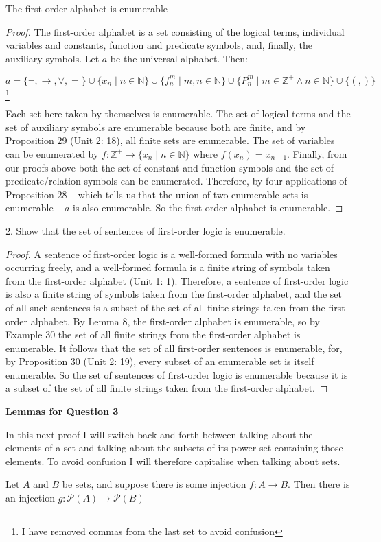 \documentclass{article}
\begin{document}
\begin{lemma} The first-order alphabet is enumerable \end{lemma}
\begin{proof} The first-order alphabet is a set consisting of the logical terms, individual variables and constants, function and predicate symbols, and, finally, the auxiliary symbols. Let $a$ be the universal alphabet. Then: \begin{center} $a = \{ \neg, \rightarrow, \forall, =\} \cup \{x_n \mid n \in \mathbb{N}\} \cup \{f_n^m \mid m,n \in \mathbb{N}\} \cup \{ P_n^m \mid m \in \mathbb{Z^+} \wedge n \in \mathbb{N} \} \cup \{(,)\}$\footnote[4]{I have removed commas from the last set to avoid confusion} \end{center} Each set here taken by themselves is enumerable. The set of logical terms and the set of auxiliary symbols are enumerable because both are finite, and by Proposition $29$ (Unit 2: 18), all finite sets are enumerable. The set of variables can be enumerated by $f : \mathbb{Z^+} \rightarrow \{x_n \mid n \in \mathbb{N}\} $ where $f(x_n) = x_{n - 1}$. Finally, from our proofs above both the set of constant and function symbols and the set of predicate/relation symbols can be enumerated. Therefore, by four applications of Proposition $28$ – which tells us that the union of two enumerable sets is enumerable – $a$ is also enumerable. So the first-order alphabet is enumerable.
 \end{proof} 2. Show that the set of sentences of first-order logic is enumerable. \begin{proof} A sentence of first-order logic is a well-formed formula with no variables occurring freely, and a well-formed formula is a finite string of symbols taken from the first-order alphabet (Unit 1: 1). Therefore, a sentence of first-order logic is also a finite string of symbols taken from the first-order alphabet, and the set of all such sentences is a subset of the set of all finite strings taken from the first-order alphabet. By Lemma 8, the first-order alphabet is enumerable, so by Example $30$ the set of all finite strings from the first-order alphabet is enumerable. It follows that the set of all first-order sentences is enumerable, for, by Proposition $30$ (Unit 2: 19), every subset of an enumerable set is itself enumerable. So the set of sentences of first-order logic is enumerable because it is a subset of the set of all finite strings taken from the first-order alphabet. 
\end{proof}
\begin{center} \textbf{Lemmas for Question 3} \end{center} In this next proof I will switch back and forth between talking about the elements of a set and talking about the subsets of its power set containing those elements. To avoid confusion I will therefore capitalise when talking about sets. \begin{lemma} Let $A$ and $B$ be sets, and suppose there is some injection $f: A \rightarrow B$. Then there is an injection $g: \mathscr{P}(A) \rightarrow \mathscr{P}(B)$ \end{lemma}
\end{document}
